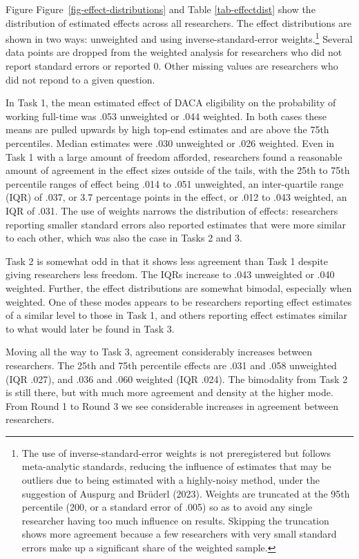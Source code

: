 \documentclass[
  letterpaper,
  DIV=11,
  numbers=noendperiod]{scrartcl}
\begin{document}
Figure Figure~\ref{fig-effect-distributions} and Table
\ref{tab-effectdist} show the distribution of estimated effects across
all researchers. The effect distributions are shown in two ways:
unweighted and using inverse-standard-error weights.\footnote{The use of
  inverse-standard-error weights is not preregistered but follows
  meta-analytic standards, reducing the influence of estimates that may
  be outliers due to being estimated with a highly-noisy method, under
  the suggestion of Auspurg and Brüderl (2023). Weights are truncated at
  the 95th percentile (200, or a standard error of .005) so as to avoid
  any single researcher having too much influence on results. Skipping
  the truncation shows more agreement because a few researchers with
  very small standard errors make up a significant share of the weighted
  sample.} Several data points are dropped from the weighted analysis
for researchers who did not report standard errors or reported 0. Other
missing values are researchers who did not repond to a given question.

In Task 1, the mean estimated effect of DACA eligibility on the
probability of working full-time was .053 unweighted or .044 weighted.
In both cases these means are pulled upwards by high top-end estimates
and are above the 75th percentiles. Median estimates were .030
unweighted or .026 weighted. Even in Task 1 with a large amount of
freedom afforded, researchers found a reasonable amount of agreement in
the effect sizes outside of the tails, with the 25th to 75th percentile
ranges of effect being .014 to .051 unweighted, an inter-quartile range
(IQR) of .037, or 3.7 percentage points in the effect, or .012 to .043
weighted, an IQR of .031. The use of weights narrows the distribution of
effects: researchers reporting smaller standard errors also reported
estimates that were more similar to each other, which was also the case
in Tasks 2 and 3.

Task 2 is somewhat odd in that it shows less agreement than Task 1
despite giving researchers less freedom. The IQRs increase to .043
unweighted or .040 weighted. Further, the effect distributions are
somewhat bimodal, especially when weighted. One of these modes appears
to be researchers reporting effect estimates of a similar level to those
in Task 1, and others reporting effect estimates similar to what would
later be found in Task 3.

Moving all the way to Task 3, agreement considerably increases between
researchers. The 25th and 75th percentile effects are .031 and .058
unweighted (IQR .027), and .036 and .060 weighted (IQR .024). The
bimodality from Task 2 is still there, but with much more agreement and
density at the higher mode. From Round 1 to Round 3 we see considerable
increases in agreement between researchers.
\end{document}
